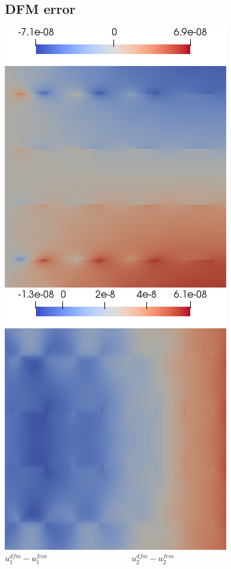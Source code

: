 \documentclass[compress,pdf,mathserif]{beamer}
\begin{document}
\subsection{DFM error}
\begin{frame}
    \centering
    \includegraphics[width=0.45\linewidth]{data/edx.png} \hspace{1em}
    \includegraphics[width=0.45\linewidth]{data/edy.png} \\
    $u_1^{dfm}-u_1^{fem} \hspace{10em} u_2^{dfm}-u_2^{fem}$
\end{frame}
\end{document}
